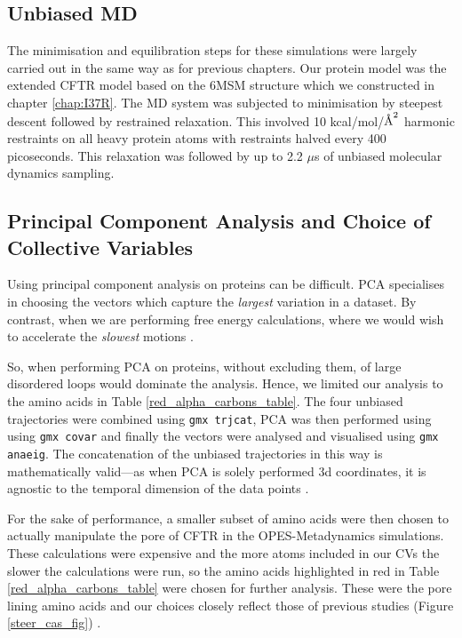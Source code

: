 \subsection{Unbiased MD }
The minimisation and equilibration steps for these simulations were largely carried out in the same way as for previous chapters. Our protein model was the extended CFTR model based on the 6MSM structure \cite{zhang2018} which we constructed in chapter \ref{chap:I37R}. The MD system was subjected to minimisation by steepest descent followed by restrained relaxation. This involved 10 kcal/mol/$\textup{\AA}^2$ harmonic restraints on all heavy protein atoms with restraints halved every 400 picoseconds. This relaxation was followed by up to 2.2 $\mu$s of unbiased molecular dynamics sampling.

\subsection {Principal Component Analysis and Choice of Collective Variables}
\label {supp_cv_choice}
Using principal component analysis on proteins can be difficult. PCA specialises in choosing the vectors which capture the \textit{largest} variation in a dataset. By contrast, when we are performing free energy calculations, where we would wish to accelerate the \textit{slowest} motions \cite{noe2001}. 

So, when performing PCA on proteins, without excluding them, of large disordered loops would dominate the analysis. Hence, we limited our analysis to the amino acids in Table \ref{red_alpha_carbons_table}. The four unbiased trajectories were combined using \verb_gmx trjcat_, PCA was then performed using using \verb_gmx covar_ and finally the vectors were analysed and visualised using \verb_gmx anaeig_. The concatenation of the unbiased trajectories in this way is mathematically valid---as when PCA is solely performed 3d coordinates, it is agnostic to the temporal dimension of the data points \cite{grus2015}.

For the sake of performance, a smaller subset of amino acids were then chosen to actually manipulate the pore of CFTR in the OPES-Metadynamics simulations. These calculations were expensive and the more atoms included in our CVs the slower the calculations were run, so the amino acids highlighted in red in Table \ref{red_alpha_carbons_table} were chosen for further analysis. These were the pore lining amino acids and our choices closely reflect those of previous studies (Figure \ref{steer_cas_fig}) \cite{hoffmann2018}. 

